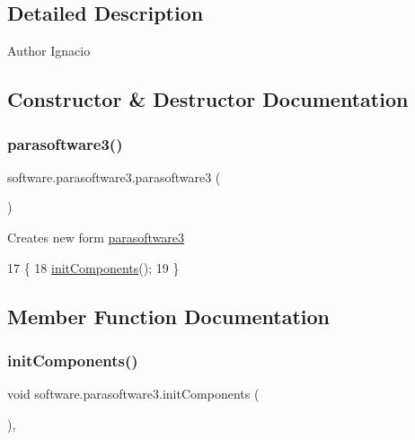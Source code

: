 \subsection{Detailed Description}
\begin{DoxyAuthor}{Author}
Ignacio 
\end{DoxyAuthor}


\subsection{Constructor \& Destructor Documentation}
\mbox{\label{classsoftware_1_1parasoftware3_a385a29df3aa055a693bbb47225703547}} 
\subsubsection{\texorpdfstring{parasoftware3()}{parasoftware3()}}
{\footnotesize\ttfamily software.\+parasoftware3.\+parasoftware3 (\begin{DoxyParamCaption}{ }\end{DoxyParamCaption})\hspace{0.3cm}{\ttfamily [inline]}}

Creates new form \mbox{\hyperlink{classsoftware_1_1parasoftware3}{parasoftware3}} 
\begin{DoxyCode}
17                            \{
18         \mbox{\hyperlink{classsoftware_1_1parasoftware3_a0078db114d1f74f8ea2f26196562da61}{initComponents}}();
19     \}
\end{DoxyCode}


\subsection{Member Function Documentation}
\mbox{\label{classsoftware_1_1parasoftware3_a0078db114d1f74f8ea2f26196562da61}} 
\subsubsection{\texorpdfstring{init\+Components()}{initComponents()}}
{\footnotesize\ttfamily void software.\+parasoftware3.\+init\+Components (\begin{DoxyParamCaption}{ }\end{DoxyParamCaption})\hspace{0.3cm}{\ttfamily [inline]}, {\ttfamily [private]}}

